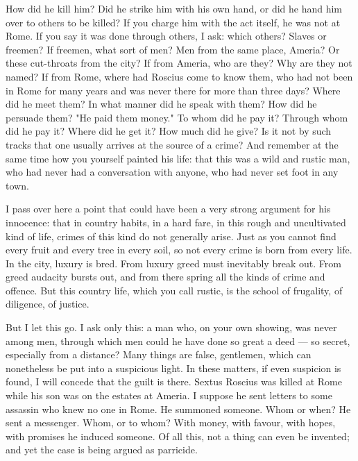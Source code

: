  How did he kill him? Did he strike him with his own hand, or did he hand him over to others to be killed? If you charge him with the act itself, he was not at Rome. If you say it was done through others, I ask: which others? Slaves or freemen? If freemen, what sort of men? Men from the same place, Ameria? Or these cut-throats from the city? If from Ameria, who are they? Why are they not named? If from Rome, where had Roscius come to know them, who had not been in Rome for many years and was never there for more than three days? Where did he meet them? In what manner did he speak with them? How did he persuade them? "He paid them money." To whom did he pay it? Through whom did he pay it? Where did he get it? How much did he give? Is it not by such tracks that one usually arrives at the source of a crime? And remember at the same time how you yourself painted his life: that this was a wild and rustic man, who had never had a conversation with anyone, who had never set foot in any town.

 I pass over here a point that could have been a very strong argument for his innocence: that in country habits, in a hard fare, in this rough and uncultivated kind of life, crimes of this kind do not generally arise. Just as you cannot find every fruit and every tree in every soil, so not every crime is born from every life. In the city, luxury is bred. From luxury greed must inevitably break out. From greed audacity bursts out, and from there spring all the kinds of crime and offence. But this country life, which you call rustic, is the school of frugality, of diligence, of justice.

 But I let this go. I ask only this: a man who, on your own showing, was never among men, through which men could he have done so great a deed --- so secret, especially from a distance? Many things are false, gentlemen, which can nonetheless be put into a suspicious light. In these matters, if even suspicion is found, I will concede that the guilt is there. Sextus Roscius was killed at Rome while his son was on the estates at Ameria. I suppose he sent letters to some assassin who knew no one in Rome. He summoned someone. Whom or when? He sent a messenger. Whom, or to whom? With money, with favour, with hopes, with promises he induced someone. Of all this, not a thing can even be invented; and yet the case is being argued as parricide.

